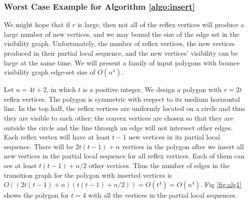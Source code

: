\documentclass[]{article}
\begin{document}
\subsubsection*{Worst Case Example for Algorithm \ref{algo:insert}}

We might hope that if $r$ is large, then not all of the reflex vertices will
produce a large number of new vertices, and we may bound the size of the edge
set in the visibility graph. Unfortunately, the number of reflex
vertices, the new vertices produced in their partial local sequence, and the new
vertices' visibility can be large at the same time. We will present a family of
input polygons with bounce visibility graph edge-set size of $O(n^4)$.

Let $n = 4t+2$, in which $t$ is a positive integer. We design a polygon with
$r = 2t$ reflex vertices. The polygon is symmetric with respect to its medium
horizontal line. In the top half, the reflex vertices are uniformly located on a
circle and thus they are visible to each other; the convex vertices are chosen
so that they are outside the circle and the line through an edge will not
intersect other edges. Each reflex vertex will have at least $t-1$ new
vertices in its partial local sequence. There will be $2t(t-1)+n$
vertices in the polygon after we insert all new vertices in the partial local
sequence for all reflex vertices. Each of them can see at least $t(t-1)+n/2$
other vertices. Thus the number of edges in the transition graph for the
polygon with inserted vertices is
$O ((2t(t-1)+n)(t(t-1)+n/2)) = O(t^4) = O(n^4)$.
Fig \ref{fig:alg1} shows the polygon for $t = 4$ with all the
vertices in the partial local sequences.
\end{document}
